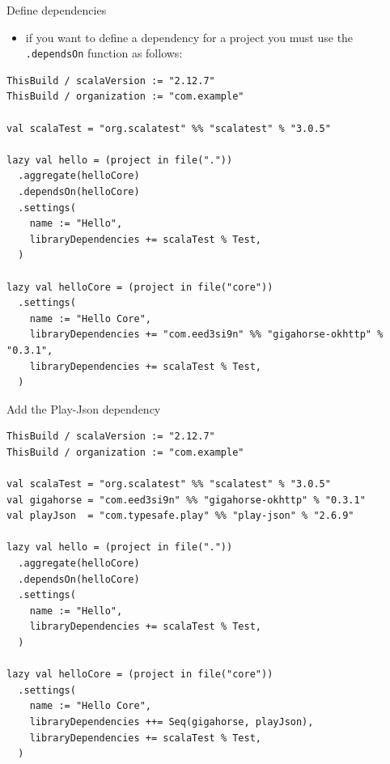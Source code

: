 \documentclass[presentation, aspectratio=169]{beamer}
\begin{document}
\begin{frame}[label={sec:org63f3c96},fragile]{Define dependencies}
 \begin{itemize}
\item if you want to define a dependency for a project you must use the \texttt{.dependsOn} function as follows:
\end{itemize}
\tiny
\begin{verbatim}
ThisBuild / scalaVersion := "2.12.7"
ThisBuild / organization := "com.example"

val scalaTest = "org.scalatest" %% "scalatest" % "3.0.5"

lazy val hello = (project in file("."))
  .aggregate(helloCore)
  .dependsOn(helloCore)
  .settings(
    name := "Hello",
    libraryDependencies += scalaTest % Test,
  )

lazy val helloCore = (project in file("core"))
  .settings(
    name := "Hello Core",
    libraryDependencies += "com.eed3si9n" %% "gigahorse-okhttp" % "0.3.1",
    libraryDependencies += scalaTest % Test,
  )
\end{verbatim}
\end{frame}

\begin{frame}[label={sec:org57a4a6d},fragile]{Add the Play-Json dependency}
 \tiny
\begin{verbatim}
ThisBuild / scalaVersion := "2.12.7"
ThisBuild / organization := "com.example"

val scalaTest = "org.scalatest" %% "scalatest" % "3.0.5"
val gigahorse = "com.eed3si9n" %% "gigahorse-okhttp" % "0.3.1"
val playJson  = "com.typesafe.play" %% "play-json" % "2.6.9"

lazy val hello = (project in file("."))
  .aggregate(helloCore)
  .dependsOn(helloCore)
  .settings(
    name := "Hello",
    libraryDependencies += scalaTest % Test,
  )

lazy val helloCore = (project in file("core"))
  .settings(
    name := "Hello Core",
    libraryDependencies ++= Seq(gigahorse, playJson),
    libraryDependencies += scalaTest % Test,
  )

\end{verbatim}
\end{frame}
\end{document}
